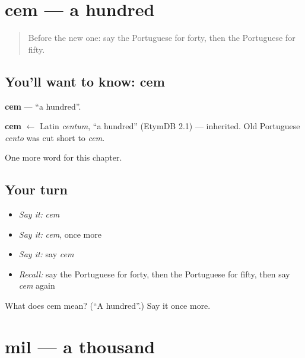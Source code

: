 \section[cem]{cem — a hundred}

\label{lesson:PT-C79-cem}



\begin{quote}
Before the new one: say the Portuguese for forty, then the Portuguese for fifty.
\end{quote}

\subsection*{You'll want to know: cem}
\textbf{cem} — \textquotedblleft{}a hundred\textquotedblright{}.

\begin{cousinweb}
\textbf{cem} $\leftarrow$ Latin \emph{centum}, \textquotedblleft{}a hundred\textquotedblright{} (EtymDB 2.1) — inherited. Old Portuguese \emph{cento} was cut short to \emph{cem}.
\end{cousinweb}

\begin{grammarlens}[title={What you've built}]
One more word for this chapter.
\end{grammarlens}

\subsection*{Your turn}
\begin{itemize}
\raggedright
  \item \emph{Say it:} \emph{cem}
  \item \emph{Say it:} \emph{cem}, once more
  \item \emph{Say it:} say \emph{cem}
  \item \emph{Recall:} say the Portuguese for forty, then the Portuguese for fifty, then say \emph{cem} again
\end{itemize}

\begin{tcolorbox}[breakable,colback=teal!4,colframe=teal!35!black,title={Before you move on}]
What does cem mean? (\textquotedblleft{}A hundred\textquotedblright{}.) Say it once more.
\end{tcolorbox}
\section[mil]{mil — a thousand}

